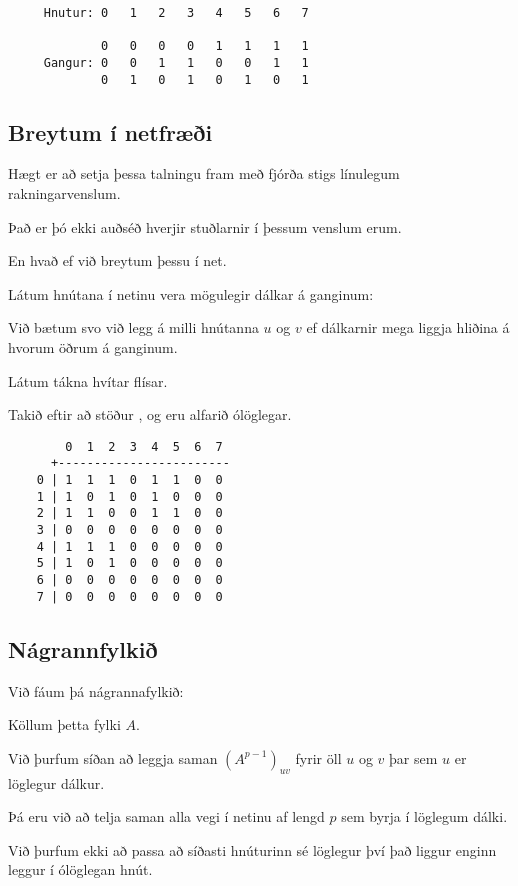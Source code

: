 { \begin{verbatim}
     Hnutur: 0   1   2   3   4   5   6   7

             0   0   0   0   1   1   1   1
     Gangur: 0   0   1   1   0   0   1   1
             0   1   0   1   0   1   0   1
\end{verbatim}}
\subsection{Breytum í netfræði}
{
    {
        \item<1-> Hægt er að setja þessa talningu fram með fjórða stigs línulegum rakningarvenslum.
        \item<2-> Það er þó ekki auðséð hverjir stuðlarnir í þessum venslum erum.
        \item<3-> En hvað ef við breytum þessu í net.
        \item<4-> Látum hnútana í netinu vera mögulegir dálkar á ganginum:
        \item<5->[] \gangar
        \item<6-> Við bætum svo við legg á milli hnútanna $u$ og $v$ ef dálkarnir mega liggja hliðina á hvorum öðrum á ganginum.
        \item<7-> Látum  tákna hvítar flísar.
        \item<8-> Takið eftir að stöður ,  og  eru alfarið ólöglegar.
    }
}

    { \begin{verbatim}
        0  1  2  3  4  5  6  7
      +------------------------
    0 | 1  1  1  0  1  1  0  0
    1 | 1  0  1  0  1  0  0  0
    2 | 1  1  0  0  1  1  0  0
    3 | 0  0  0  0  0  0  0  0
    4 | 1  1  1  0  0  0  0  0
    5 | 1  0  1  0  0  0  0  0
    6 | 0  0  0  0  0  0  0  0
    7 | 0  0  0  0  0  0  0  0
\end{verbatim}}
\subsection{Nágrannfylkið}
{
    {
        \item<1-> Við fáum þá nágrannafylkið:
        \item<2->[] \gangarfylki
        \item<3-> Köllum þetta fylki $A$.
        \item<4-> Við þurfum síðan að leggja saman $(A^{p - 1})_{uv}$ fyrir öll $u$ og $v$ þar sem $u$ er löglegur dálkur.
        \item<5-> Þá eru við að telja saman alla vegi í netinu af lengd $p$ sem byrja í löglegum dálki.
        \item<6-> Við þurfum ekki að passa að síðasti hnúturinn sé löglegur því það liggur enginn leggur í ólöglegan hnút.
    }
}

